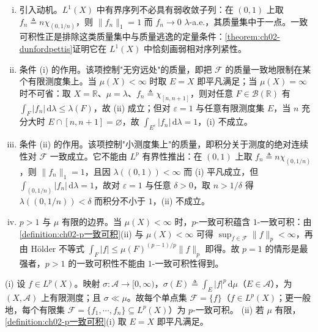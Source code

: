 \documentclass[../../main.tex]{subfiles}%
\begin{document}
\begin{remark}\label{remark:ch02-一致可积动机}
\begin{enumerate}[(i)]
\item 引入动机。$L^1(X)$ 中有界序列不必具有弱收敛子列：在 $(0,1)$ 上取 $f_n\triangleq n\chi_{(0,1/n)}$，则 $\|f_n\|_1=1$ 而 $f_n\to0$ $\lambda$-a.e.，其质量集中于一点。一致可积性正是排除这类质量集中与质量逃逸的定量条件：\cref{theorem:ch02-dunfordpettis}证明它在 $L^1(X)$ 中恰刻画弱相对序列紧性。
\item 条件 (i) 的作用。该项控制"无穷远处"的质量，即把 $\mathscr F$ 的质量一致地限制在某个有限测度集上。当 $\mu(X)<\infty$ 时取 $E=X$ 即平凡满足；当 $\mu(X)=\infty$ 时不可省：取 $X=\mathbb R$、$\mu=\lambda$、$f_n\triangleq\chi_{[n,n+1]}$，则对任意 $F\in\mathscr B(\mathbb R)$ 有 $\int_F|f_n|\,\mathrm{d}\lambda\leqslant\lambda(F)$，故 (ii) 成立；但对 $\varepsilon=1$ 与任意有限测度集 $E$，当 $n$ 充分大时 $E\cap[n,n+1]=\varnothing$，故 $\int_{E^c}|f_n|\,\mathrm{d}\lambda=1$，(i) 不成立。
\item 条件 (ii) 的作用。该项控制"小测度集上"的质量，即积分关于测度的绝对连续性对 $\mathscr F$ 一致成立。它不能由 $L^p$ 有界性推出：在 $(0,1)$ 上取 $f_n\triangleq n\chi_{(0,1/n)}$，则 $\|f_n\|_1=1$，且因 $\lambda((0,1))<\infty$ 而 (i) 平凡成立，但 $\int_{(0,1/n)}|f_n|\,\mathrm{d}\lambda=1$，故对 $\varepsilon=1$ 与任意 $\delta>0$，取 $n>1/\delta$ 得 $\lambda((0,1/n))<\delta$ 而积分不小于 $1$，(ii) 不成立。
\item $p>1$ 与 $\mu$ 有限的边界。当 $\mu(X)<\infty$ 时，$p$-一致可积蕴含 $1$-一致可积：由\cref{definition:ch02-p一致可积}(ii) 与 $\mu(X)<\infty$ 可得 $\sup_{f\in\mathscr F}\|f\|_p<\infty$，再由 Hölder 不等式 $\int_F|f|\leqslant\mu(F)^{(p-1)/p}\|f\|_p$ 即得。故 $p=1$ 的情形是最强者，$p>1$ 的一致可积性不能由 $1$-一致可积性得到。
\end{enumerate}
\end{remark}

\begin{remark}\label{remark:ch02-单点一致可积}
(i) 设 $f\in L^p(X)$。映射 $\sigma:\mathscr A\to[0,\infty)$，$\sigma(E)\triangleq \int_E|f|^p\,\mathrm{d}\mu$（$E\in\mathscr A$），为 $(X,\mathscr A)$ 上有限测度；且 $\sigma\ll\mu$。故每个单点集 $\mathscr F=\{f\}$（$f\in L^p(X)$；更一般地，每个有限集 $\mathscr F=\{f_1,\cdots ,f_n\}\subseteq L^p(X)$）为 $p$-一致可积。
(ii) 若 $\mu$ 有限，\cref{definition:ch02-p一致可积}(i) 取 $E=X$ 即平凡满足。
\end{remark}
\end{document}
